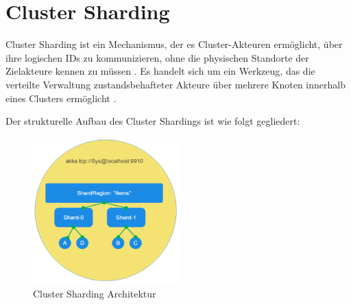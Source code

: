 \section{Cluster Sharding}

Cluster Sharding ist ein Mechanismus, der es Cluster-Akteuren ermöglicht, über ihre logischen IDs 
zu kommunizieren, ohne die physischen Standorte der Zielakteure kennen zu müssen \parencite{getakka_cluster_sharding}.  
Es handelt sich um ein Werkzeug, das die verteilte Verwaltung zustandsbehafteter Akteure über 
mehrere Knoten innerhalb eines Clusters ermöglicht \parencite{cluster_sharding_petabridge}.  

Der strukturelle Aufbau des Cluster Shardings ist wie folgt gegliedert:

\begin{figure}[H]
    \centering
    \includegraphics[width=0.5\textwidth]{assets/cluster-sharding.png}
    \caption{Cluster Sharding Architektur \parencite{cluster_sharding_petabridge}}
    \label{fig:architecture}
\end{figure}

